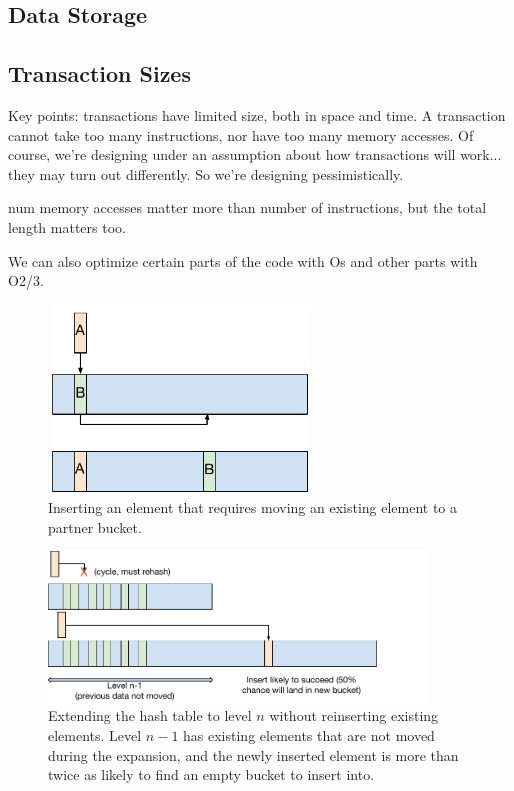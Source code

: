 \subsection{Data Storage}
\label{sec:ds}

\subsection{Transaction Sizes}

Key points: transactions have limited size, both in space and time. A
transaction cannot take too many instructions, nor have too many memory
accesses. Of course, we're designing under an assumption about how transactions
will work... they may turn out differently. So we're designing pessimistically.

num memory accesses matter more than number of instructions, but the total length
matters too.

We can also optimize certain parts of the code with Os and other parts with
O2/3.












\begin{figure}
\centering
\includegraphics[width=70mm,height=50mm]{fig/cuckoo_insert}
\caption{Inserting an element that requires moving an existing element to a
partner bucket.}
\label{fig:insert}
\end{figure}

\begin{figure}
\centering
\hspace*{1mm}
\includegraphics[width=100mm]{fig/cuckoo_rehash}
\caption{Extending the hash table to level $n$ without reinserting existing
elements. Level $n-1$ has existing elements that are not moved during the
expansion, and the newly inserted element is more than twice as likely to find
an empty bucket to insert into.}
\label{fig:rehash}
\end{figure}


